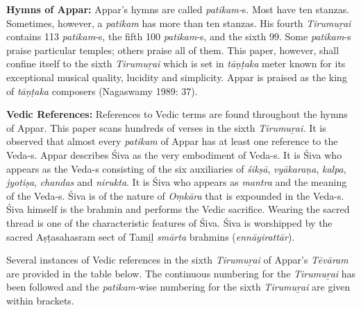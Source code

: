 \textbf{Hymns of Appar:} Appar’s hymns are called \textit{patikam-}s. Most have ten stanzas. Sometimes, however, a \textit{patikam} has more than ten stanzas. His fourth \textit{Tirumuṟai }contains 113 \textit{patikam}-s, the fifth 100 \textit{patikam}-s, and the sixth 99. Some \textit{patikam}-s praise particular temples; others praise all of them. This paper, however, shall confine itself to the sixth \textit{Tirumuṟai} which is set in \textit{tāṇṭaka} meter known for its exceptional musical quality, lucidity and simplicity. Appar is praised as the king of \textit{tāṇṭaka }composers (Nagaswamy 1989: 37).

\textbf{Vedic References:} References to Vedic terms are found throughout the hymns of Appar. This paper scans hundreds of verses in the sixth \textit{Tirumuṟai. }It is observed that almost every \textit{patikam} of Appar has at least one reference to the Veda-s. Appar describes Śiva as the very embodiment of Veda-s. It is Śiva who appears as the Veda-s consisting of the six auxiliaries of \textit{śikṣā}, \textit{vyākaraṇa}, \textit{kalpa}, \textit{jyotiṣa}, \textit{chandas} and \textit{nirukta}. It is Śiva who appears as \textit{mantra} and the meaning of the Veda-s. Śiva is of the nature of \textit{Oṃkāra }that is expounded in the Veda-s. Śiva himself is the brahmin and performs the Vedic sacrifice. Wearing the sacred thread is one of the characteristic features of Śiva. Śiva is worshipped by the sacred Aṣṭasahasram sect of Tamiḻ \textit{smārta} brahmins (\textit{ennāyirattār}).

Several instances of Vedic references in the sixth \textit{Tirumuṟai} of Appar’s \textit{Tēvāram} are provided in the table below. The continuous numbering for the \textit{Tirumuṟai }has been followed and the \textit{patikam-}wise numbering for the sixth \textit{Tirumuṟai }are given within brackets.

